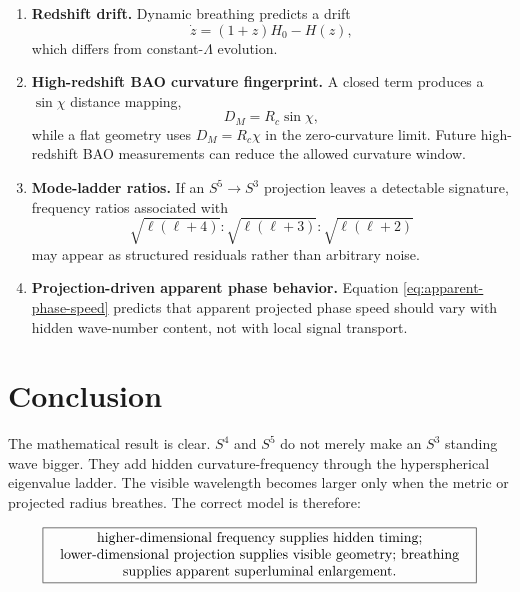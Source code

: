 \documentclass[11pt]{article}
\begin{document}
\begin{enumerate}[leftmargin=2em]
 \item \textbf{Redshift drift.} Dynamic breathing predicts a drift
 \begin{equation}
  \dot z=(1+z)H_0-H(z),
 \end{equation}
 which differs from constant-$\Lambda$ evolution.

 \item \textbf{High-redshift BAO curvature fingerprint.} A closed term produces a $\sin\chi$ distance mapping,
 \begin{equation}
  D_M=R_c\sin\chi,
 \end{equation}
 while a flat geometry uses $D_M=R_c\chi$ in the zero-curvature limit.  Future high-redshift BAO measurements can reduce the allowed curvature window.

 \item \textbf{Mode-ladder ratios.} If an $S^5\rightarrow S^3$ projection leaves a detectable signature, frequency ratios associated with
 \begin{equation}
  \sqrt{\ell(\ell+4)}:\sqrt{\ell(\ell+3)}:\sqrt{\ell(\ell+2)}
 \end{equation}
 may appear as structured residuals rather than arbitrary noise.

 \item \textbf{Projection-driven apparent phase behavior.} Equation \eqref{eq:apparent-phase-speed} predicts that apparent projected phase speed should vary with hidden wave-number content, not with local signal transport.
\end{enumerate}

\section{Conclusion}

The mathematical result is clear.  $S^4$ and $S^5$ do not merely make an $S^3$ standing wave bigger.  They add hidden curvature-frequency through the hyperspherical eigenvalue ladder.  The visible wavelength becomes larger only when the metric or projected radius breathes.  The correct model is therefore:

\begin{equation}
\boxed{\begin{minipage}{0.88\linewidth}\centering
higher-dimensional frequency supplies hidden timing; lower-dimensional projection supplies visible geometry; breathing supplies apparent superluminal enlargement.
\end{minipage}}
\end{equation}
\end{document}
